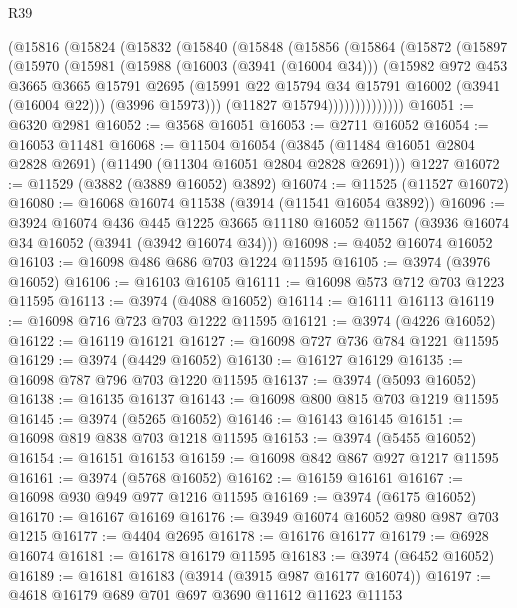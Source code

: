 \begin{lexlean}{R39}
\begin{coremodule}
        (@15816
          (@15824
            (@15832
              (@15840
                (@15848
                  (@15856
                    (@15864
                      (@15872
                        (@15897
                          (@15970
                            (@15981
                              (@15988
                                (@16003 (@3941 (@16004 @34)))
                                (@15982
                                  @972
                                  @453
                                  @3665
                                  @3665
                                  @15791
                                  @2695
                                  (@15991 @22 @15794 @34 @15791 @16002 (@3941 (@16004 @22)))
                                  (@3996 @15973)))
                              (@11827 @15794))))))))))))))
@16051 := @6320 @2981
@16052 := @3568 @16051
@16053 := @2711 @16052
@16054 := @16053 @11481
@16068 := @11504
    @16054
    (@3845 (@11484 @16051 @2804 @2828 @2691) (@11490 (@11304 @16051 @2804 @2828 @2691)))
    @1227
@16072 := @11529 (@3882 (@3889 @16052) @3892)
@16074 := @11525 (@11527 @16072)
@16080 := @16068 @16074 @11538 (@3914 (@11541 @16054 @3892))
@16096 := @3924
    @16074
    @436
    @445
    @1225
    @3665
    @11180
    @16052
    @11567
    (@3936 @16074 @34 @16052 (@3941 (@3942 @16074 @34)))
@16098 := @4052 @16074 @16052
@16103 := @16098 @486 @686 @703 @1224 @11595
@16105 := @3974 (@3976 @16052)
@16106 := @16103 @16105
@16111 := @16098 @573 @712 @703 @1223 @11595
@16113 := @3974 (@4088 @16052)
@16114 := @16111 @16113
@16119 := @16098 @716 @723 @703 @1222 @11595
@16121 := @3974 (@4226 @16052)
@16122 := @16119 @16121
@16127 := @16098 @727 @736 @784 @1221 @11595
@16129 := @3974 (@4429 @16052)
@16130 := @16127 @16129
@16135 := @16098 @787 @796 @703 @1220 @11595
@16137 := @3974 (@5093 @16052)
@16138 := @16135 @16137
@16143 := @16098 @800 @815 @703 @1219 @11595
@16145 := @3974 (@5265 @16052)
@16146 := @16143 @16145
@16151 := @16098 @819 @838 @703 @1218 @11595
@16153 := @3974 (@5455 @16052)
@16154 := @16151 @16153
@16159 := @16098 @842 @867 @927 @1217 @11595
@16161 := @3974 (@5768 @16052)
@16162 := @16159 @16161
@16167 := @16098 @930 @949 @977 @1216 @11595
@16169 := @3974 (@6175 @16052)
@16170 := @16167 @16169
@16176 := @3949 @16074 @16052 @980 @987 @703 @1215
@16177 := @4404 @2695
@16178 := @16176 @16177
@16179 := @6928 @16074
@16181 := @16178 @16179 @11595
@16183 := @3974 (@6452 @16052)
@16189 := @16181 @16183 (@3914 (@3915 @987 @16177 @16074))
@16197 := @4618 @16179 @689 @701 @697 @3690 @11612 @11623 @11153

\end{coremodule}
\end{lexlean}
